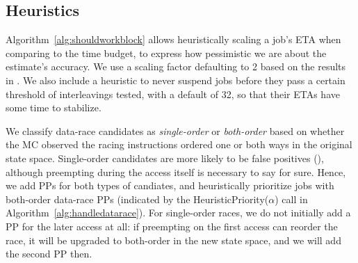 \subsection{Heuristics}
Algorithm~\ref{alg:shouldworkblock} allows heuristically scaling a job's ETA when comparing to the time budget,
to express how pessimistic we are about the estimate's accuracy.
We use a scaling factor defaulting to 2 based on the results in \cite{estimation}.
We also include a heuristic to
never suspend jobs before they pass a certain threshold of interleavings tested,
with a default of 32,
so that their ETAs have some time to stabilize.

We classify data-race candidates as {\em single-order} or {\em both-order} \cite{portend}
based on whether the MC observed the racing instructions ordered one or both ways in the original state space.
Single-order candidates are more likely to be false positives (\sect{\ref{sec:overview-dr}}),
although preempting during the access itself is necessary to say for sure.
Hence, we add PPs for both types of candiates, and heuristically prioritize jobs with both-order data-race PPs
(indicated by the HeuristicPriority($\alpha$) call in Algorithm~\ref{alg:handledatarace}).
For single-order races, we do not initially add a PP for the later access at all:
if preempting on the first access can reorder the race, it will be upgraded to both-order in the new state space, and we will add the second PP then.
